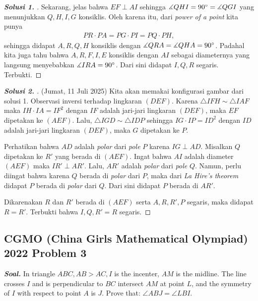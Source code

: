 \documentclass[letterpaper, 13pt]{scrartcl}
\begin{document}
\begin{proof}[\textbf{Solusi 1. }]
    Sekarang, jelas bahwa $EF \perp AI$ sehingga $\measuredangle QHI = 90^\circ = \measuredangle QGI$ yang menunjukkan $Q,H,I,G$ konsiklis. Oleh karena itu, dari \textit{power of a point} kita punya
    \begin{align*}
        PR \cdot PA = PG \cdot PI = PQ \cdot PH,
    \end{align*}
    sehingga didapat $A,R,Q,H$ konsiklis dengan $\measuredangle QRA = \measuredangle QHA = 90^\circ$. 
    Padahal kita juga tahu bahwa $A,R,F,I,E$ konsiklis dengan $AI$ sebagai diameternya yang langsung menyebabkan $\measuredangle IRA = 90^\circ$. Dari sini didapat $I,Q,R$ segaris. Terbukti.
\end{proof}

\begin{proof}[\textbf{Solusi 2. }] (Jumat, 11 Juli 2025)
    Kita akan memakai konfigurasi gambar dari solusi 1. Observasi inversi terhadap lingkaran $(DEF)$.
    Karena $\triangle IFH \sim \triangle IAF$ maka $IH \cdot IA = IF^2$ dengan $IF$ adalah jari-jari lingkaran $(DEF)$, maka $EF$ dipetakan ke $(AEF)$.
    Lalu, $\triangle IGD \sim \triangle IDP$ sehingga $IG \cdot IP = ID^2$ dengan $ID$ adalah jari-jari lingkaran $(DEF)$, maka $G$ dipetakan ke $P$.

    Perhatikan bahwa $AD$ adalah \textit{polar} dari \textit{pole} $P$ karena $IG \perp AD$.
    Misalkan $Q$ dipetakan ke $R'$ yang berada di $(AEF)$. Ingat bahwa $AI$ adalah diameter $(AEF)$ maka $IR' \perp AR'$.
    Lalu, $AR'$ adalah \textit{polar} dari \textit{pole} $Q$.
    Namun, perlu diingat bahwa karena $Q$ berada di \textit{polar} dari $P$, maka dari \textit{La Hire's theorem} didapat $P$ berada di \textit{polar} dari $Q$. Dari sini didapat $P$ berada di $AR'$.

    Dikarenakan $R$ dan $R'$ berada di $(AEF)$ serta $A,R,R',P$ segaris, maka didapat $R=R'$. Terbukti bahwa $I,Q,R'=R$ segaris.
\end{proof}


\subsection{CGMO (China Girls Mathematical Olympiad) 2022 Problem 3}


\textbf{\textit{Soal. }}In triangle $ABC,AB>AC,I$ is the incenter, $AM$ is the midline. The line crosses $I$ and is perpendicular to $BC $ intersect $AM$ at point $L$, and the symmetry of $I$ with respect to point $A$ is $J$. Prove that: $\angle ABJ= \angle LBI$.
\end{document}
